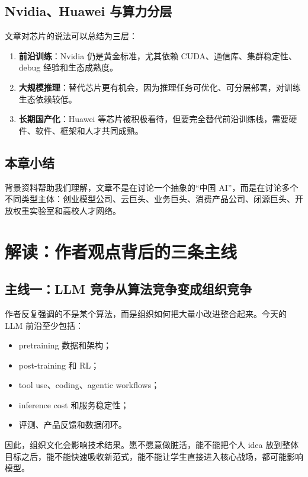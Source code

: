 \documentclass[a4paper]{article}
\begin{document}
\subsection{Nvidia、Huawei 与算力分层}

文章对芯片的说法可以总结为三层：

\begin{enumerate}[leftmargin=1.5em]
    \item \textbf{前沿训练}：Nvidia 仍是黄金标准，尤其依赖 CUDA、通信库、集群稳定性、debug 经验和生态成熟度。
    \item \textbf{大规模推理}：替代芯片更有机会，因为推理任务可优化、可分层部署，对训练生态依赖较低。
    \item \textbf{长期国产化}：Huawei 等芯片被积极看待，但要完全替代前沿训练栈，需要硬件、软件、框架和人才共同成熟。
\end{enumerate}

\subsection{本章小结}

背景资料帮助我们理解，文章不是在讨论一个抽象的``中国 AI''，而是在讨论多个不同类型主体：创业模型公司、云巨头、业务巨头、消费产品公司、闭源巨头、开放权重实验室和高校人才网络。


\section{解读：作者观点背后的三条主线}

\subsection{主线一：LLM 竞争从算法竞争变成组织竞争}

作者反复强调的不是某个算法，而是组织如何把大量小改进整合起来。今天的 LLM 前沿至少包括：

\begin{itemize}[leftmargin=1.5em]
    \item pretraining 数据和架构；
    \item post-training 和 RL；
    \item tool use、coding、agentic workflows；
    \item inference cost 和服务稳定性；
    \item 评测、产品反馈和数据闭环。
\end{itemize}

因此，组织文化会影响技术结果。愿不愿意做脏活，能不能把个人 idea 放到整体目标之后，能不能快速吸收新范式，能不能让学生直接进入核心战场，都可能影响模型。
\end{document}
